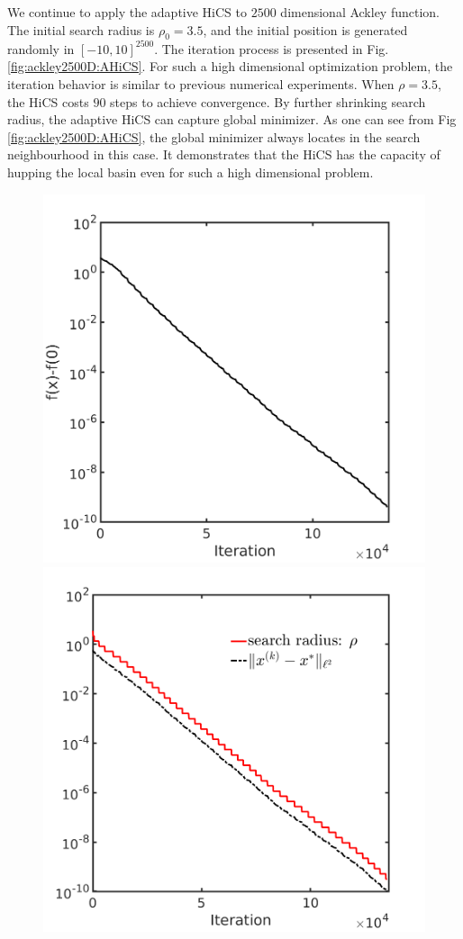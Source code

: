 \documentclass[mathpazo]{csam}
\theoremstyle{remark}
\begin{document}
We continue to apply the adaptive HiCS to $2500$ dimensional
Ackley function. The initial search radius is $\rho_0=3.5$, and
the initial position is generated randomly in $[-10,10]^{2500}$. 
The iteration process is presented in Fig.\,\ref{fig:ackley2500D:AHiCS}. 
For such a high dimensional optimization problem, the iteration
behavior is similar to previous numerical experiments. 
When $\rho=3.5$, the HiCS costs $90$ steps to achieve convergence.
By further shrinking search radius, the adaptive HiCS can
capture global minimizer. As one can see from 
Fig\,\ref{fig:ackley2500D:AHiCS}, the global minimizer always
locates in the search neighbourhood in this case. 
It demonstrates that the HiCS has the capacity of hupping the
local basin even for such a high dimensional problem.
\begin{figure}[!htbp] 
	\centering
	\includegraphics[scale=0.25]{../figures/ackley2500D.png}
	\includegraphics[scale=0.25]{../figures/ackley2500D_dist.png}

\end{figure}
\end{document}
